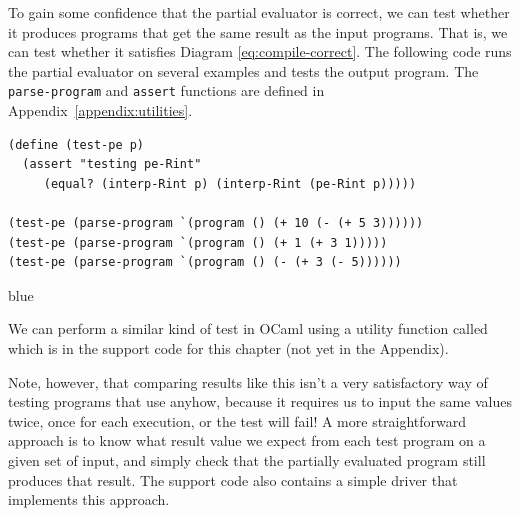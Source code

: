 \documentclass[11pt]{book}
\newenvironment{ocamlx}{
  \begin{color}{blue}
}
{
  \end{color}
}
\begin{document}
To gain some confidence that the partial evaluator is correct, we can
test whether it produces programs that get the same result as the
input programs. That is, we can test whether it satisfies Diagram
\ref{eq:compile-correct}. The following code runs the partial
evaluator on several examples and tests the output program.  The
\texttt{parse-program} and \texttt{assert} functions are defined in
Appendix~\ref{appendix:utilities}.\\
\begin{minipage}{1.0\textwidth}
\begin{lstlisting}
(define (test-pe p)
  (assert "testing pe-Rint"
     (equal? (interp-Rint p) (interp-Rint (pe-Rint p)))))

(test-pe (parse-program `(program () (+ 10 (- (+ 5 3))))))
(test-pe (parse-program `(program () (+ 1 (+ 3 1)))))
(test-pe (parse-program `(program () (- (+ 3 (- 5))))))
\end{lstlisting}
\end{minipage}

\begin{ocamlx}
  We can perform a similar kind of test in OCaml using a utility
  function called  which is in the support
  code for this chapter (not yet in the Appendix).

  Note, however, that comparing
  results like this isn't a very satisfactory way of testing programs
  that use  anyhow, because it requires us to input the
  same values twice, once for each execution, or the test will fail!
  A more straightforward approach is to know what result value we
  expect from each test program on a given set of input, and simply check
  that the partially evaluated program still produces that result.
  The support code also contains a simple driver that implements this approach.
\end{ocamlx}
\end{document}
